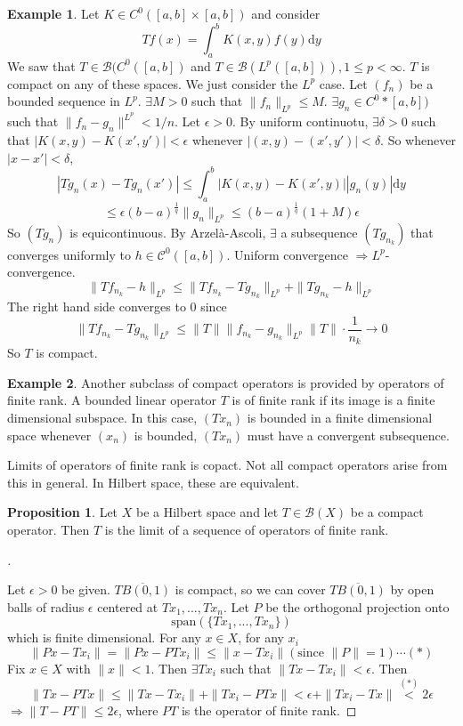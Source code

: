 \documentclass{article}
\theoremstyle{definition}
\newtheorem{ex}{Example}
\newtheorem{prop}{Proposition}
\newenvironment{proofs}[1][\proofname]{%
  \begin{proof}[#1]$ $\par\nobreak\ignorespaces
}{%
  \end{proof}
}
\newcommand{\B}{\mathcal B}
\newcommand{\C}{\mathcal C}
\begin{document}
\begin{ex}
	Let $K \in C^0([a, b] \times [a, b])$ and consider 
	\[
		T f(x) = \int_a^b K(x, y) f(y) \mathrm{d} y
	\]
	We saw that $T \in \B(C^0([a, b])$ and $T \in \B(L^p([a, b])), 1 \leq p < \infty$.
	$T$ is compact on any of these spaces.
	We just consider the $L^p$ case.
	Let $(f_n)$ be a bounded sequence in $L^p$.
	$\exists M > 0$ such that $\|f_n\|_{L^p} \leq M$.
	$\exists g_n \in C^0*[a, b])$ such that $\|f_n - g_n\|^{L^p} < 1/n$.
	Let $\epsilon > 0$.
	By uniform continuotu, $\exists \delta > 0$ such that $|K(x, y) - K(x', y')| < \epsilon$ whenever $|(x, y) - (x', y')| < \delta$.
	So whenever $|x - x'| < \delta$, 
	\[
		|T g_n(x) - T g_n(x')| \leq \int_a^b |K(x, y) - K(x', y)| |g_n(y)| \mathrm{d} y
	\]
	\[
		\leq \epsilon (b - a)^{\frac{1}{q}} \|g_n\|_{L^p} \leq (b - a)^{\frac{1}{q}} (1 + M)\epsilon
	\]
	So $(T g_n)$ is equicontinuous.
	By Arzel\`a-Ascoli, $\exists$ a subsequence $(T g_{n_k})$ that converges uniformly to $h \in \C^0([a, b])$.
	Uniform convergence $\Rightarrow L^p$-convergence.
	\[
		\|T f_{n_k} - h\|_{L^p} \leq \|T f_{n_k} - T g_{n_k}\|_{L^p} + \|T g_{n_k} - h \|_{L^p} 
	\]
	The right hand side converges to 0 since
	\[
		\|T f_{n_k} - T g_{n_k}\|_{L^p} \leq \|T\|\|f_{n_k} - g_{n_k}\|_{L^p}  \|T\| \cdot \frac{1}{n_k} \to 0
	\]
	So $T$ is compact.
\end{ex}

\begin{ex}
	Another subclass of compact operators is provided by operators of finite rank.
	A bounded linear operator $T$ is of finite rank if its image is a finite dimensional subspace.
	In this case, $(T x_n)$ is bounded in a finite dimensional space whenever $(x_n)$ is bounded, $(T x_n)$ must have a convergent subsequence.
\end{ex}

Limits of operators of finite rank is copact.
Not all compact operators arise from this in general.
In Hilbert space, these are equivalent.

\begin{prop}
	Let $X$ be a Hilbert space and let $T \in \B(X)$ be a compact operator.
	Then $T$ is the limit of a sequence of operators of finite rank.
\end{prop}

\begin{proofs}
	Let $\epsilon > 0$ be given.
	$\overline{TB(0, 1)}$ is compact, so we can cover $\overline{TB(0, 1)}$ by open balls of radius $\epsilon$ centered at $T x_1, ..., T x_n$.
	Let $P$ be the orthogonal projection onto 
	\[
		\text{span}(\{T x_1, ..., T x_n\})
	\]
	which is finite dimensional.
	For any $x \in X$, for any $x_i$
	\[
		\|P x - T x_i\| = \|P x - P T x_i\| \leq \|x - T x_i\| (\text{since } \|P\| = 1) \cdots (*)
	\]
	Fix $x \in X$ with $\|x\| < 1$.
	Then $\exists T x_i$ such that $\|T x - T x_i\| < \epsilon$.
	Then 
	\[
		\| T x - P T x\| \leq \|T x - T x_i\| + \| T x_i - P T x\| < \epsilon + \|T x_i - T x\| \stackrel{(*)}{<} 2 \epsilon 
	\]
	$\Rightarrow \|T - P T\| \leq 2 \epsilon$, where $PT$ is the operator of finite rank.
\end{proofs}
\end{document}
